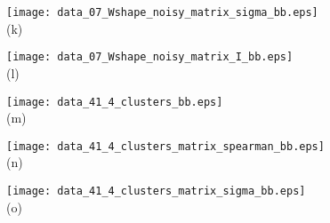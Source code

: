 \documentclass[journal]{vgtc}                %
\begin{document}
\begin{figure*}[ht!]
\begin{minipage}{0.23\textwidth}
     \texttt{[image: data\_07\_Wshape\_noisy\_matrix\_sigma\_bb.eps]}\\

   \hspace{-0.25cm} \footnotesize (k) 
  \end{minipage}
  \hfill
  \begin{minipage}{0.23\textwidth}
   \centering

     \texttt{[image: data\_07\_Wshape\_noisy\_matrix\_I\_bb.eps]}\\

   \hspace{-0.32cm} \footnotesize (l) 
  \end{minipage}  

  \mbox{} \medskip
   
  
  \begin{minipage}{0.25\textwidth}
   \centering

     \hspace{-0.3cm} \texttt{[image: data\_41\_4\_clusters\_bb.eps]}\\


   \hspace{0.27cm}  \footnotesize (m) 
  \end{minipage}
  \hfill
  \begin{minipage}{0.23\textwidth}
   \centering

     \texttt{[image: data\_41\_4\_clusters\_matrix\_spearman\_bb.eps]}\\
     
   \hspace{-0.13cm} \footnotesize (n) 
  \end{minipage}
  \hfill
  \begin{minipage}{0.23\textwidth}
   \centering

     \texttt{[image: data\_41\_4\_clusters\_matrix\_sigma\_bb.eps]}\\
     
   \hspace{-0.25cm} \footnotesize (o) 
  \end{minipage}
  \hfill
  \begin{minipage}{0.23\textwidth}
   \centering


\end{minipage}
\end{figure*}
\end{document}
